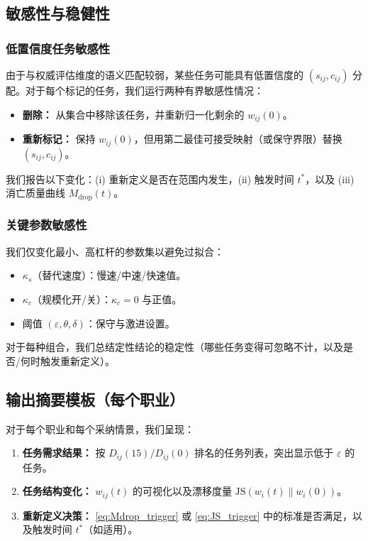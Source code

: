 \subsection{敏感性与稳健性}
\label{sec:sensitivity}

\subsubsection{低置信度任务敏感性}
\label{sec:low_conf_task}
由于与权威评估维度的语义匹配较弱，某些任务可能具有低置信度的 $(s_{ij},c_{ij})$ 分配。对于每个标记的任务，我们运行两种有界敏感性情况：
\begin{itemize}
  \item \textbf{删除：} 从集合中移除该任务，并重新归一化剩余的 $w_{ij}(0)$。
  \item \textbf{重新标记：} 保持 $w_{ij}(0)$，但用第二最佳可接受映射（或保守界限）替换 $(s_{ij},c_{ij})$。
\end{itemize}
我们报告以下变化：(i) 重新定义是否在范围内发生，(ii) 触发时间 $t^*$，以及 (iii) 消亡质量曲线 $M_{\text{drop}}(t)$。

\subsubsection{关键参数敏感性}
\label{sec:param_sens}
我们仅变化最小、高杠杆的参数集以避免过拟合：
\begin{itemize}
  \item $\kappa_s$（替代速度）：慢速/中速/快速值。
  \item $\kappa_c$（规模化开/关）：$\kappa_c=0$ 与正值。
  \item 阈值 $(\varepsilon,\theta,\delta)$：保守与激进设置。
\end{itemize}
对于每种组合，我们总结定性结论的稳定性（哪些任务变得可忽略不计，以及是否/何时触发重新定义）。

\subsection{输出摘要模板（每个职业）}
\label{sec:output_template}
对于每个职业和每个采纳情景，我们呈现：
\begin{enumerate}
  \item \textbf{任务需求结果：} 按 $D_{ij}(15)/D_{ij}(0)$ 排名的任务列表，突出显示低于 $\varepsilon$ 的任务。
  \item \textbf{任务结构变化：} $w_{ij}(t)$ 的可视化以及漂移度量 $\mathrm{JS}(w_i(t)\|w_i(0))$。
  \item \textbf{重新定义决策：} \eqref{eq:Mdrop_trigger} 或 \eqref{eq:JS_trigger} 中的标准是否满足，以及触发时间 $t^*$（如适用）。
\end{enumerate}
